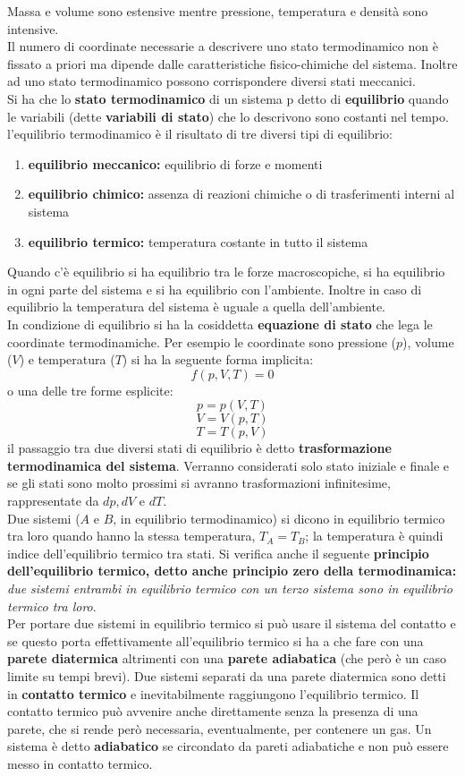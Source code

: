 \documentclass[a4paper,12pt, oneside]{book}
\begin{document}
Massa e volume sono estensive mentre pressione, temperatura e densità sono intensive.\\
Il numero di coordinate necessarie a descrivere uno stato termodinamico non è fissato a priori ma dipende dalle caratteristiche fisico-chimiche del sistema. Inoltre ad uno stato termodinamico possono corrispondere diversi stati meccanici. \\
Si ha che lo \textbf{stato termodinamico} di un sistema p detto di \textbf{equilibrio} quando le variabili (dette \textbf{variabili di stato}) che lo descrivono sono costanti nel tempo.\\
l'equilibrio termodinamico è il risultato di tre diversi tipi di equilibrio:
\begin{enumerate}
	\item \textbf{equilibrio meccanico:} equilibrio di forze e momenti
	\item \textbf{equilibrio chimico:} assenza di reazioni chimiche o di trasferimenti interni al sistema
	\item \textbf{equilibrio termico:} temperatura costante in tutto il sistema
\end{enumerate}
Quando c'è equilibrio si ha equilibrio tra le forze macroscopiche, si ha equilibrio in ogni parte del sistema e si ha equilibrio con l'ambiente. Inoltre in caso di equilibrio la temperatura del sistema è uguale a quella dell'ambiente.\\
In condizione di equilibrio si ha la cosiddetta \textbf{equazione di stato} che lega le coordinate termodinamiche. Per esempio le coordinate sono pressione ($p$), volume ($V$) e temperatura ($T$) si ha la seguente forma implicita:
$$f(p,V,T)=0$$
o una delle tre forme esplicite:
$$p=p(V,T)$$
$$V=V(p,T)$$
$$T=T(p,V)$$
il passaggio tra due diversi stati di equilibrio è detto \textbf{trasformazione termodinamica del sistema}. Verranno considerati solo stato iniziale e finale e se gli stati sono molto prossimi si avranno trasformazioni infinitesime, rappresentate da $dp, dV \mbox{ e } dT$.\\
Due sistemi ($A$ e $B$, in equilibrio termodinamico) si dicono in equilibrio termico tra loro quando hanno la stessa temperatura, $T_A=T_B$; la temperatura è quindi indice dell'equilibrio termico tra stati. Si verifica anche il seguente \textbf{principio dell'equilibrio termico, detto anche principio zero della termodinamica:}\\
\textit{due sistemi entrambi in equilibrio termico con un terzo sistema sono in equilibrio termico tra loro}.\\
Per portare due sistemi in equilibrio termico si può usare il sistema del contatto e se questo porta effettivamente all'equilibrio termico si ha a che fare con una \textbf{parete diatermica} altrimenti con una \textbf{parete adiabatica} (che però è un caso limite su tempi brevi). Due sistemi separati da una parete diatermica sono detti in \textbf{contatto termico} e inevitabilmente raggiungono l'equilibrio termico. Il contatto termico può avvenire anche direttamente senza la presenza di una parete, che si rende però necessaria, eventualmente, per contenere un gas. Un sistema è detto \textbf{adiabatico} se circondato da pareti adiabatiche e non può essere messo in contatto termico.
\end{document}
